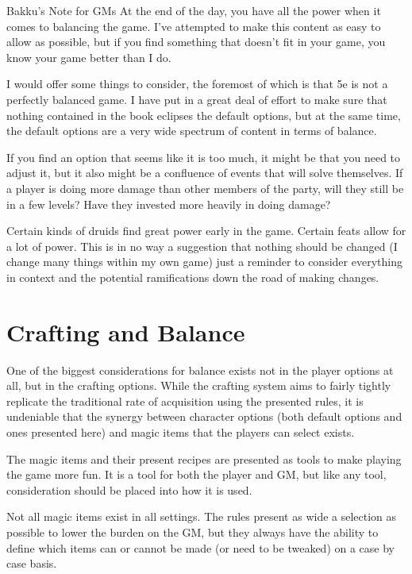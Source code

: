 \documentclass[11pt,twoside,openany]{book}  %
\begin{document}
\begin{CalloutBox}{Bakku's Note for GMs}
At the end of the day, you have all the power when it comes to balancing the game. I’ve attempted to make this content as easy to allow as possible, but if you find something that doesn’t fit in your game, you know your game better than I do.

I would offer some things to consider, the foremost of which is that 5e is not a perfectly balanced game. I have put in a great deal of effort to make sure that nothing contained in the book eclipses the default options, but at the same time, the default options are a very wide spectrum of content in terms of balance.

If you find an option that seems like it is too much, it might be that you need to adjust it, but it also might be a confluence of events that will solve themselves. If a player is doing more damage than other members of the party, will they still be in a few levels? Have they invested more heavily in doing damage?

Certain kinds of druids find great power early in the game. Certain feats allow for a lot of power. This is in no way a suggestion that nothing should be changed (I change many things within my own game) just a reminder to consider everything in context and the potential ramifications down the road of making changes.
\end{CalloutBox}


\section*{Crafting and Balance}
One of the biggest considerations for balance exists not in the player options at all, but in the crafting options. While the crafting system aims to fairly tightly replicate the traditional rate of acquisition using the presented rules, it is undeniable that the synergy between character options (both default options and ones presented here) and magic items that the players can select exists.

The magic items and their present recipes are presented as tools to make playing the game more fun. It is a tool for both the player and GM, but like any tool, consideration should be placed into how it is used.

Not all magic items exist in all settings. The rules present as wide a selection as possible to lower the burden on the GM, but they always have the ability to define which items can or cannot be made (or need to be tweaked) on a case by case basis.
\end{document}
